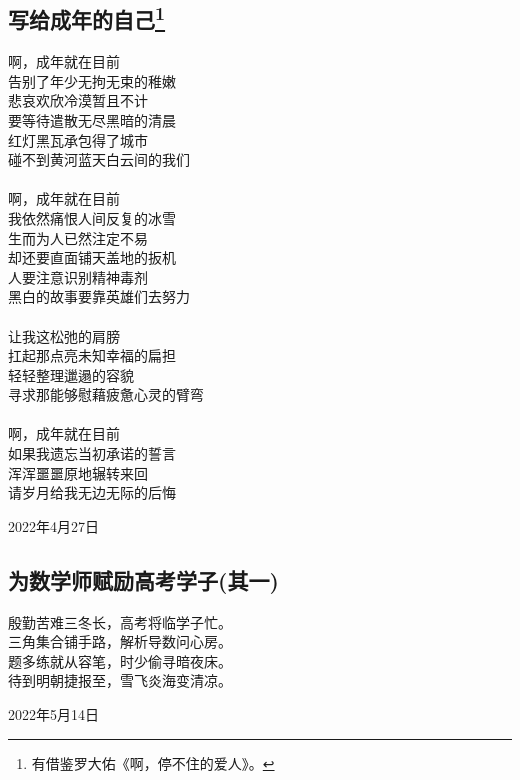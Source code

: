 \documentclass[a5paper]{ctexart}
\begin{document}
	
	\subsection[写给成年的自己]{写给成年的自己\footnote{有借鉴罗大佑《啊，停不住的爱人》。}}
	\begin{center}
		啊，成年就在目前\\
		告别了年少无拘无束的稚嫩\\
		悲哀欢欣冷漠暂且不计\\
		要等待遣散无尽黑暗的清晨\\
		红灯黑瓦承包得了城市\\
		碰不到黄河蓝天白云间的我们\\ \hspace*{\fill} \\
		
		啊，成年就在目前\\
		我依然痛恨人间反复的冰雪\\
		生而为人已然注定不易\\
		却还要直面铺天盖地的扳机\\
		人要注意识别精神毒剂\\
		黑白的故事要靠英雄们去努力\\ \hspace*{\fill} \\
		
		让我这松弛的肩膀\\
		扛起那点亮未知幸福的扁担\\
		轻轻整理邋遢的容貌\\
		寻求那能够慰藉疲惫心灵的臂弯\\ \hspace*{\fill} \\
		
		啊，成年就在目前\\
		如果我遗忘当初承诺的誓言\\
		浑浑噩噩原地辗转来回\\
		请岁月给我无边无际的后悔
	\end{center}
	\hfill 2022年4月27日
	
	
	\subsection{为数学师赋励高考学子(其一)}
	\begin{center}
		殷勤苦难三冬长，高考将临学子忙。\\
		三角集合铺手路，解析导数问心房。\\
		题多练就从容笔，时少偷寻暗夜床。\\
		待到明朝捷报至，雪飞炎海变清凉。
	\end{center}
	\hfill 2022年5月14日
	
\end{document}
